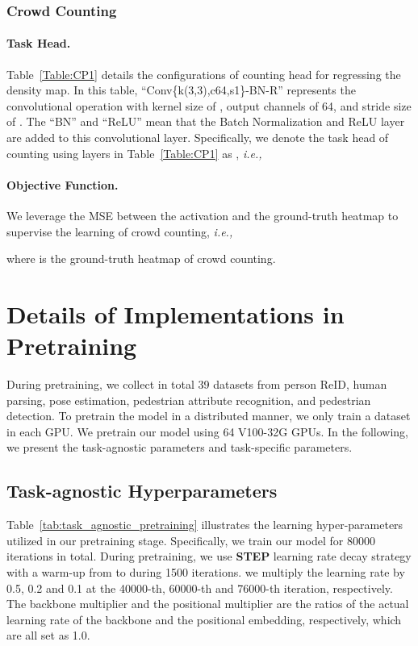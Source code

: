 \documentclass[10pt,twocolumn,letterpaper]{article}
\begin{document}
\subsubsection{Crowd Counting}
\paragraph{Task Head.} Table~\ref{Table:CP1} details the configurations of counting head for regressing the density map. In this table, ``Conv\{k(3,3),c64,s1\}-BN-R'' represents the convolutional operation with kernel size of , output channels of 64, and stride size of . The ``BN'' and ``ReLU'' mean that the Batch Normalization and ReLU layer are added to this convolutional layer. Specifically, we denote the task head of counting using layers in Table~\ref{Table:CP1} as , \emph{i.e.,}



\paragraph{Objective Function.} We leverage the MSE between the activation and the ground-truth heatmap to supervise the learning of crowd counting, \emph{i.e.,}

where  is the ground-truth heatmap of crowd counting.

\section{Details of Implementations in Pretraining}
During pretraining, we collect in total 39 datasets from person ReID, human parsing, pose estimation, pedestrian attribute recognition, and pedestrian detection. To pretrain the model in a distributed manner, we only train a dataset in each GPU. We pretrain our model using 64 V100-32G GPUs. In the following, we present the task-agnostic parameters and task-specific parameters.

\subsection{Task-agnostic Hyperparameters}
Table~\ref{tab:task_agnostic_pretraining} illustrates the learning hyper-parameters utilized in our pretraining stage. Specifically, we train our model for 80000 iterations in total. During pretraining, we use \textbf{STEP} learning rate decay strategy with a warm-up from  to  during 1500 iterations. we multiply the learning rate  by 0.5, 0.2 and 0.1 at the 40000-th, 60000-th and 76000-th iteration, respectively. The backbone multiplier and the positional multiplier are the ratios of the actual learning rate of the backbone and the positional embedding, respectively, which are all set as 1.0.
\end{document}
